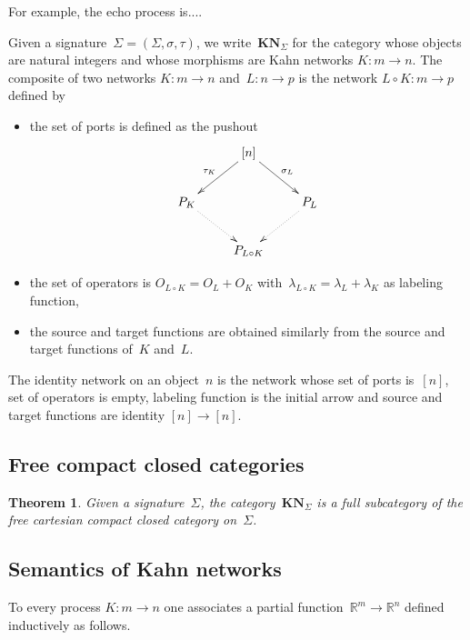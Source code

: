 \documentclass{article}
\newtheorem{theorem}{Theorem}
\newcommand{\R}{\mathbb{R}}
\newcommand{\intset}[1]{[#1]}
\newcommand{\category}[1]{\mathbf{#1}}
\newcommand{\KN}{\category{KN}}
\begin{document}
For example, the echo process is....

Given a signature~$\Sigma=(\Sigma,\sigma,\tau)$, we write~$\KN_\Sigma$ for the
category whose objects are natural integers and whose morphisms are Kahn
networks \hbox{$K:m\to n$}. The composite of two networks $K:m\to n$ and~$L:n\to
p$ is the network $L\circ K:m\to p$ defined by
\begin{itemize}
\item the set of ports is defined as the pushout
  \[
  \xymatrix{
    &\ar[dl]_{\tau_K}\intset{n}\ar[dr]^{\sigma_L}&\\
    P_K\ar@{.>}[dr]&&\ar@{.>}[dl]P_L\\
    &P_{L\circ K}&\\
  }
  \]
\item the set of operators is $O_{L\circ K}=O_L+O_K$ with~$\lambda_{L\circ
    K}=\lambda_L+\lambda_K$ as labeling function,
\item the source and target functions are obtained similarly from the source and
  target functions of~$K$ and~$L$.
\end{itemize}
The identity network on an object~$n$ is the network whose set of ports
is~$\intset{n}$, set of operators is empty, labeling function is the initial
arrow and source and target functions are identity $\intset{n}\to\intset{n}$.

\subsection{Free compact closed categories}
\begin{theorem}
  Given a signature~$\Sigma$, the category~$\KN_\Sigma$ is a full subcategory
  of the free cartesian compact closed category on~$\Sigma$.
\end{theorem}

\subsection{Semantics of Kahn networks}
To every process $K:m\to n$ one associates a partial function~$\R^m\to\R^n$
defined inductively as follows.
\end{document}
